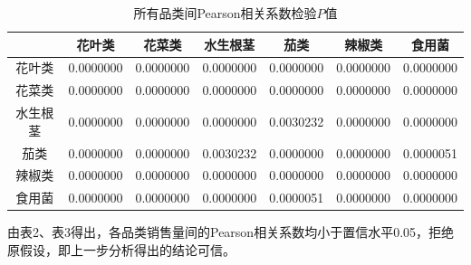 \documentclass{article}
\begin{document}
	\begin{table}[h!]
		\centering
		\caption{所有品类间Pearson相关系数检验$P$值}
		\label{tab:p_value_all}
		\renewcommand{\arraystretch}{1.5} 
		\renewcommand{\heavyrulewidth}{1.2pt}
		\begin{tabular}{ccccccc}
			\toprule
			& 花叶类 & 花菜类 & 水生根茎 & 茄类 & 辣椒类 & 食用菌 \\
			\midrule
			花叶类 & 0.0000000 & 0.0000000 & 0.0000000 & 0.0000000 & 0.0000000 & 0.0000000 \\
			花菜类 & 0.0000000 & 0.0000000 & 0.0000000 & 0.0000000 & 0.0000000 & 0.0000000 \\
			水生根茎 & 0.0000000 & 0.0000000 & 0.0000000 & 0.0030232 & 0.0000000 & 0.0000000 \\
			茄类 & 0.0000000 & 0.0000000 & 0.0030232 & 0.0000000 & 0.0000000 & 0.0000051 \\
			辣椒类 & 0.0000000 & 0.0000000 & 0.0000000 & 0.0000000 & 0.0000000 & 0.0000000 \\
			食用菌 & 0.0000000 & 0.0000000 & 0.0000000 & 0.0000051 & 0.0000000 & 0.0000000 \\
			\bottomrule
		\end{tabular}
		\renewcommand{\heavyrulewidth}{0.8pt}
	\end{table}
	
	由表2、表3得出，各品类销售量间的Pearson相关系数均小于置信水平0.05，拒绝原假设，即上一步分析得出的结论可信。
\end{document}
